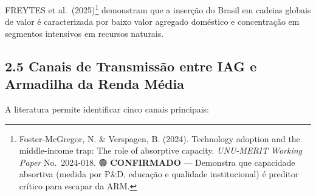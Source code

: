 \documentclass[
  brazilian,
  12pt,
]{article}
\begin{document}
FREYTES et al.~(2025)\footnote{Foster-McGregor, N. \& Verspagen, B. (2024). Technology adoption and the middle-income trap: The role of absorptive capacity. \emph{UNU-MERIT Working Paper} No.~2024-018. 🟢 \textbf{CONFIRMADO} --- Demonstra que capacidade absortiva (medida por P\&D, educação e qualidade institucional) é preditor crítico para escapar da ARM.} demonstram que a inserção do Brasil em cadeias globais de valor é caracterizada por baixo valor agregado doméstico e concentração em segmentos intensivos em recursos naturais.

\subsection{2.5 Canais de Transmissão entre IAG e Armadilha da Renda Média}\label{canais-de-transmissuxe3o-entre-iag-e-armadilha-da-renda-muxe9dia}

A literatura permite identificar cinco canais principais:
\end{document}
